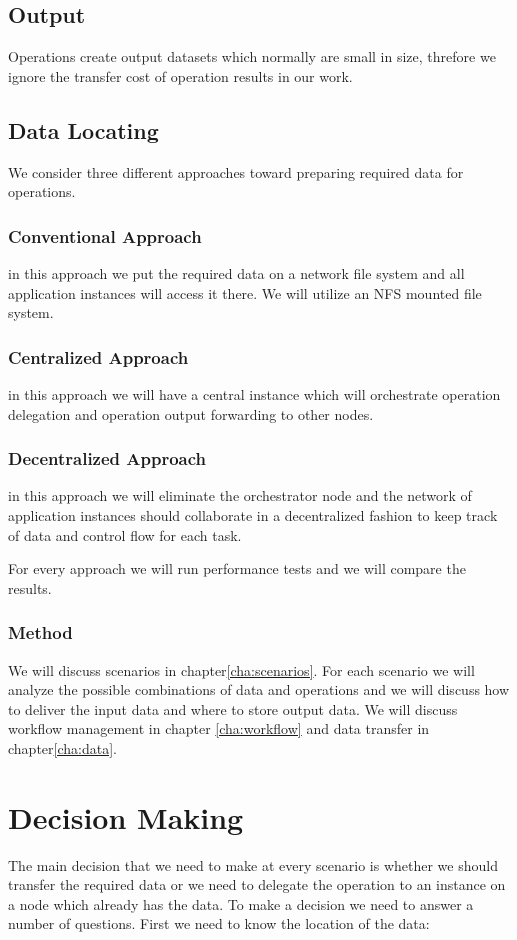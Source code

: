 \subsection{Output}
Operations create output datasets which normally are small in size, threfore we ignore the transfer cost of operation
results in our work.

\subsection{Data Locating}
We consider three different approaches toward preparing required data for operations.
\subsubsection{Conventional Approach}
in this approach we put the required data on a network file system and all
application instances will access it there. We will utilize an NFS mounted file system.
\subsubsection{Centralized Approach}
in this approach we will have a central instance which will orchestrate operation
delegation and operation output forwarding to other nodes.
\subsubsection{Decentralized Approach}
in this approach we will eliminate the orchestrator node and the network of
application instances should collaborate in a decentralized fashion to keep track of data and control flow for each
task.

For every approach we will run performance tests and we will compare the results.

\subsubsection{Method}
We will discuss scenarios in chapter\ref{cha:scenarios}. For each scenario we will analyze the possible combinations 
of data and operations and we will discuss how to 
deliver the input data and where to store output data. We will discuss workflow management in chapter 
\ref{cha:workflow} and data transfer in chapter\ref{cha:data}.


\section{Decision Making}
The main decision that we need to make at every scenario is whether we should transfer the required data or we
need to delegate the operation to an instance on a node which already has the data. To make a decision we need to
answer a number of questions. First we need to know the location of the data:

